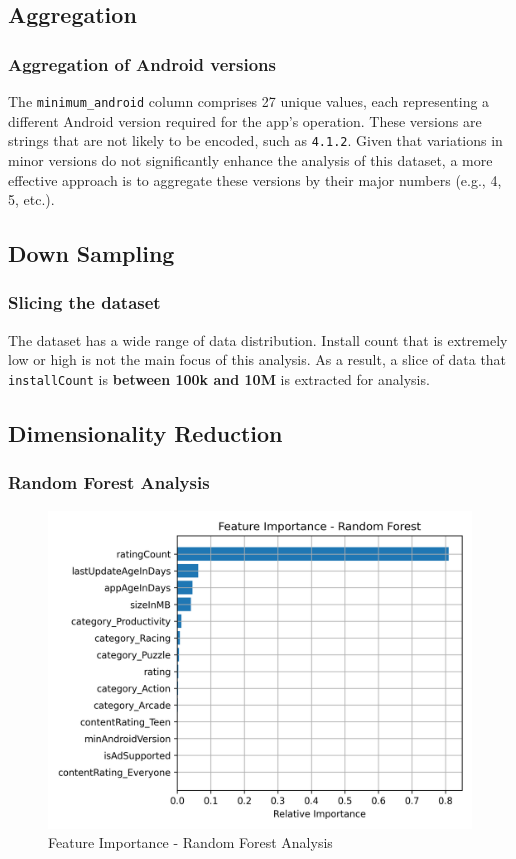 \subsection{Aggregation}
\subsubsection{Aggregation of Android versions}
The \texttt{minimum\_android} column comprises 27 unique values, each representing a different Android version required for the app's operation. These versions are strings that are not likely to be encoded, such as \texttt{4.1.2}. Given that variations in minor versions do not significantly enhance the analysis of this dataset, a more effective approach is to aggregate these versions by their major numbers (e.g., 4, 5, etc.).

\subsection{Down Sampling}
\subsubsection{Slicing the dataset}
The dataset has a wide range of data distribution. Install count that is extremely low or high is not the main focus of this analysis. As a result, a slice of data that \texttt{installCount} is \textbf{between 100k and 10M} is extracted for analysis.

\subsection{Dimensionality Reduction}
\subsubsection{Random Forest Analysis}

\begin{figure}[h]
    \centering
    \includegraphics[width=\textwidth]{docs//assets/rfa.png}
    \caption{Feature Importance - Random Forest Analysis}
    \label{fig:rfa}
\end{figure}

